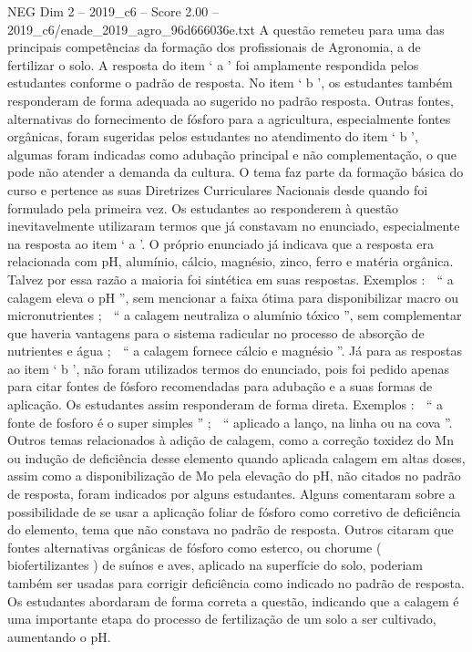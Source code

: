 \begin{textsample}{NEG Dim 2 – 2019\_c6 – Score 2.00 – 2019\_c6/enade\_2019\_agro\_96d666036e.txt}
A questão remeteu para uma das principais competências da formação dos profissionais de Agronomia, a de fertilizar o solo.
A resposta do item ‘ a ’ foi amplamente respondida pelos estudantes conforme o padrão de resposta.
No item ‘ b ’, os estudantes também responderam de forma adequada ao sugerido no padrão resposta.
Outras fontes, alternativas do fornecimento de fósforo para a agricultura, especialmente fontes orgânicas, foram sugeridas pelos estudantes no atendimento do item ‘ b ’, algumas foram indicadas como adubação principal e não complementação, o que pode não atender a demanda da cultura.
O tema faz parte da formação básica do curso e pertence as suas Diretrizes Curriculares Nacionais desde quando foi formulado pela primeira vez.
Os estudantes ao responderem à questão inevitavelmente utilizaram termos que já constavam no enunciado, especialmente na resposta ao item ‘ a ’.
O próprio enunciado já indicava que a resposta era relacionada com pH, alumínio, cálcio, magnésio, zinco, ferro e matéria orgânica.
Talvez por essa razão a maioria foi sintética em suas respostas.
Exemplos :  “ a calagem eleva o pH ”, sem mencionar a faixa ótima para disponibilizar macro ou micronutrientes ;  “ a calagem neutraliza o alumínio tóxico ”, sem complementar que haveria vantagens para o sistema radicular no processo de absorção de nutrientes e água ;  “ a calagem fornece cálcio e magnésio ”.
Já para as respostas ao item ‘ b ’, não foram utilizados termos do enunciado, pois foi pedido apenas para citar fontes de fósforo recomendadas para adubação e a suas formas de aplicação.
Os estudantes assim responderam de forma direta.
Exemplos :  “ a fonte de fosforo é o super simples ” ;  “ aplicado a lanço, na linha ou na cova ”.
Outros temas relacionados à adição de calagem, como a correção toxidez do Mn ou indução de deficiência desse elemento quando aplicada calagem em altas doses, assim como a disponibilização de Mo pela elevação do pH, não citados no padrão de resposta, foram indicados por alguns estudantes.
Alguns comentaram sobre a possibilidade de se usar a aplicação foliar de fósforo como corretivo de deficiência do elemento, tema que não constava no padrão de resposta.
Outros citaram que fontes alternativas orgânicas de fósforo como esterco, ou chorume ( biofertilizantes ) de suínos e aves, aplicado na superfície do solo, poderiam também ser usadas para corrigir deficiência como indicado no padrão de resposta.
Os estudantes abordaram de forma correta a questão, indicando que a calagem é uma importante etapa do processo de fertilização de um solo a ser cultivado, aumentando o pH.

\end{textsample}
